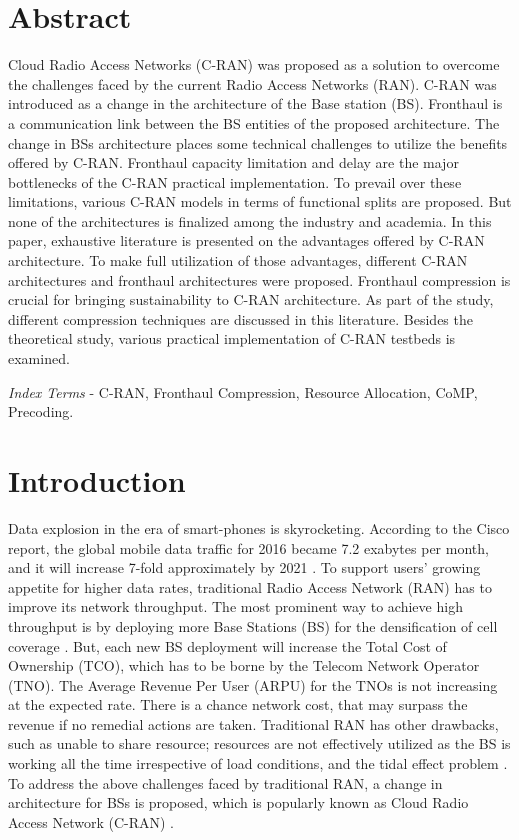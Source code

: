 \begin{multicols}{2}

\section*{Abstract}

Cloud Radio Access Networks (C-RAN) was proposed as a solution to overcome the challenges faced by the current Radio Access Networks (RAN). C-RAN was introduced as a change in the architecture of the Base station (BS). Fronthaul is a communication link between the BS entities of the proposed architecture. The change in BSs architecture places some technical challenges to utilize the benefits offered by C-RAN. Fronthaul capacity limitation and delay are the major bottlenecks of the C-RAN practical implementation. To prevail over these limitations, various C-RAN models in terms of functional splits are proposed. But none of the architectures is finalized among the industry and academia. In this paper, exhaustive literature is presented on the advantages offered by C-RAN architecture. To make full utilization of those advantages, different C-RAN architectures and fronthaul architectures were proposed. Fronthaul compression is crucial for bringing sustainability to C-RAN architecture. As part of the study, different compression techniques are discussed in this literature. Besides the theoretical study, various practical implementation of C-RAN testbeds is examined.

\textit{Index Terms} - C-RAN, Fronthaul Compression, Resource Allocation, CoMP, Precoding.

\section{Introduction}

Data explosion in the era of smart-phones is skyrocketing. According to the Cisco report, the global mobile data traffic for 2016 became 7.2 exabytes per month, and it will increase 7-fold approximately by 2021 \cite{art3-key01}. To support users’ growing appetite for higher data rates, traditional Radio Access Network (RAN) has to improve its network throughput. The most prominent way to achieve high throughput is by deploying more Base Stations (BS) for the densification of cell coverage \cite{art3-key02}. But, each new BS deployment will increase the Total Cost of Ownership (TCO), which has to be borne by the Telecom Network Operator (TNO). The Average Revenue Per User (ARPU) for the TNOs is not increasing at the expected rate. There is a chance network cost, that may surpass the revenue if no remedial actions are taken. Traditional RAN has other drawbacks, such as unable to share resource; resources are not effectively utilized as the BS is working all the time irrespective of load conditions, and the tidal effect problem \cite{art3-key03}. To address the above challenges faced by traditional RAN, a change in architecture for BSs is proposed, which is popularly known as Cloud Radio Access Network (C-RAN) \cite{art3-key04}.


\end{multicols}
